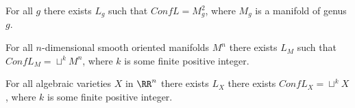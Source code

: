 \documentclass[11pt]{scrartcl}
\begin{document}
  \begin{theorem}
    For all $g$ there exists $L_{g}$ such that $Conf L = M_{g}^{2}$,
    where $M_{g}$ is a manifold of genus $g$.
  \end{theorem}

  \begin{theorem}
    For all $n$-dimensional smooth oriented manifolds $M^{n}$ there
    exists $L_{M}$ such that $Conf L_{M} = \sqcup^{k} M^{n}$, where
    $k$ is some finite positive integer.
  \end{theorem}

  \begin{theorem}
    For all algebraic varieties $X$ in $\RR^{n}$ there exists $L_{X}$
    there exists $Conf L_{X} = \sqcup ^{k} X$, where $k$ is some
    finite positive integer.
  \end{theorem}




  
\end{document}
